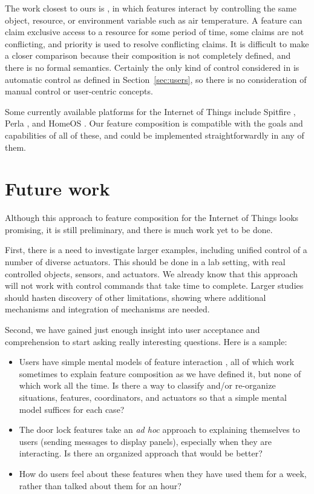 \documentclass[conference]{IEEEtran}
\begin{document}
The work closest to ours is 
\cite{kolberg2008},
in which 
features interact by controlling the same
object, resource, or environment variable such as air temperature.
A feature can claim exclusive access to a resource for some period
of time, some claims are not conflicting,
and priority is used to resolve conflicting claims.
It is difficult to make a closer comparison because their composition
is not completely defined, and there is no
formal semantics.
Certainly the only kind of control considered in \cite{kolberg2008}
is automatic control
as defined in Section~\ref{sec:users}, so
there is no consideration of manual control or user-centric
concepts.

Some currently available platforms for the Internet of Things include
Spitfire \cite{spitfire}, Perla \cite{perla}, and 
HomeOS \cite{homeOS,homeOSnsdi}.
Our feature composition is compatible with the goals and capabilities
of all of these, and could be implemented straightforwardly in any of
them.

\section{Future work}
\label{sec:future}

Although this approach to feature composition for the Internet of
Things looks promising, it is still preliminary, and there is much
work yet to be done.

First, there is a need to 
investigate larger examples, including unified control of 
a number of diverse actuators.
This should be done in a lab setting, with real controlled objects,
sensors, and actuators.
We already know that this approach will not work with control commands
that take time to complete.
Larger studies should hasten discovery of other limitations, showing where
additional mechanisms and integration of mechanisms are needed.

Second, we have gained just enough insight into user acceptance
and comprehension to start asking really interesting questions.
Here is a sample:
\begin{itemize}
\item
Users have simple mental models of feature interaction \cite{lanaCHI},
all of which work sometimes to explain feature composition as we
have defined it, but none of which work all the time.
Is there a way to classify and/or
re-organize situations, features, coordinators, and actuators
so that a simple mental model
suffices for each case?
\item
The door lock features take an {\it ad hoc} approach to explaining
themselves to users (sending messages to display panels), 
especially when they are interacting.
Is there an organized approach that would be better? 
\item
How do users feel about these features when they have used them for
a week, rather than talked about them for an hour?
\end{itemize}
\end{document}

